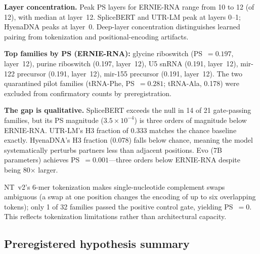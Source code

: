 \documentclass[11pt]{article}
\begin{document}
\textbf{Layer concentration.}
Peak PS layers for ERNIE-RNA range from 10 to 12 (of 12), with
median at layer~12.  SpliceBERT and UTR-LM peak at layers 0--1;
HyenaDNA peaks at layer~0.  Deep-layer concentration distinguishes
learned pairing from tokenization and positional-encoding artifacts.

\textbf{Top families by PS (ERNIE-RNA):}
glycine riboswitch (PS~$= 0.197$, layer~12),
purine riboswitch (0.197, layer~12),
U5 snRNA (0.191, layer~12),
mir-122 precursor (0.191, layer~12),
mir-155 precursor (0.191, layer~12).
The two quarantined pilot families (tRNA-Phe, PS~$= 0.281$;
tRNA-Ala, 0.178) were excluded from confirmatory counts by
preregistration.

\textbf{The gap is qualitative.}
SpliceBERT exceeds the null in 14 of 21 gate-passing families, but
its PS magnitude ($3.5 \times 10^{-4}$) is three orders of magnitude
below ERNIE-RNA.  UTR-LM's H3 fraction of 0.333 matches the chance
baseline exactly.  HyenaDNA's H3 fraction (0.078) falls below chance,
meaning the model systematically perturbs partners less than adjacent
positions.  Evo (7B parameters) achieves PS~$= 0.001$---three orders
below ERNIE-RNA despite being 80$\times$ larger.

NT~v2's 6-mer tokenization makes single-nucleotide complement swaps
ambiguous (a swap at one position changes the encoding of up to six
overlapping tokens); only 1 of 32 families passed the positive
control gate, yielding PS~$= 0$.  This reflects tokenization
limitations rather than architectural capacity.


\subsection{Preregistered hypothesis summary}
\label{sec:hypotheses}
\end{document}
